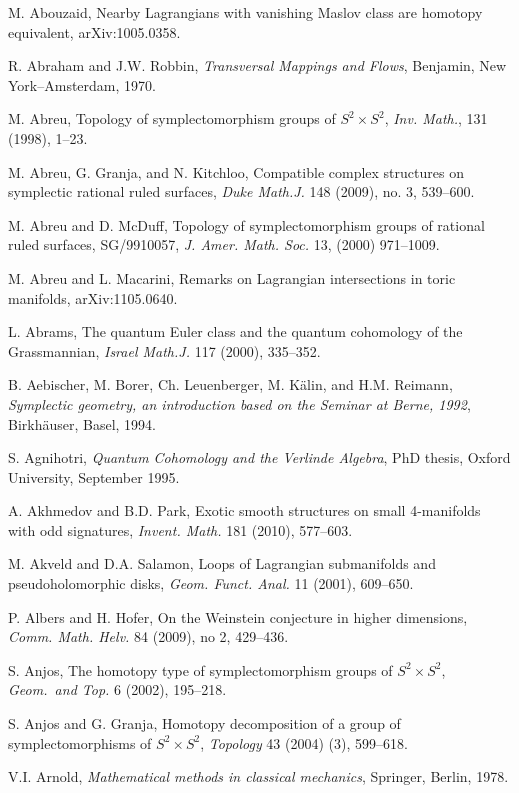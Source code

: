 
 M. Abouzaid, Nearby Lagrangians with vanishing Maslov class are homotopy equivalent, arXiv:1005.0358.

 R. Abraham and J.W. Robbin, \emph{Transversal Mappings and Flows}, Benjamin, New York–Amsterdam, 1970.

 M. Abreu, Topology of symplectomorphism groups of $S^{2}\times S^{2}$, \emph{Inv. Math.}, 131 (1998), 1–23.

 M. Abreu, G. Granja, and N. Kitchloo, Compatible complex structures on symplectic rational ruled surfaces, \emph{Duke Math.J.} 148 (2009), no. 3, 539–600.

 M. Abreu and D. McDuff, Topology of symplectomorphism groups of rational ruled surfaces, SG/9910057, \emph{J. Amer. Math. Soc.} 13, (2000) 971–1009.

 M. Abreu and L. Macarini, Remarks on Lagrangian intersections in toric manifolds, arXiv:1105.0640.

 L. Abrams, The quantum Euler class and the quantum cohomology of the Grassmannian, \emph{Israel Math.J.} 117 (2000), 335–352.

 B. Aebischer, M. Borer, Ch. Leuenberger, M. Kälin, and H.M. Reimann, \emph{Symplectic geometry, an introduction based on the Seminar at Berne, 1992}, Birkhäuser, Basel, 1994.

 S. Agnihotri, \emph{Quantum Cohomology and the Verlinde Algebra}, PhD thesis, Oxford University, September 1995.

 A. Akhmedov and B.D. Park, Exotic smooth structures on small 4-manifolds with odd signatures, \emph{Invent. Math.} 181 (2010), 577–603.

 M. Akveld and D.A. Salamon, Loops of Lagrangian submanifolds and pseudoholomorphic disks, \emph{Geom. Funct. Anal.} 11 (2001), 609–650.

 P. Albers and H. Hofer, On the Weinstein conjecture in higher dimensions, \emph{Comm. Math. Helv.} 84 (2009), no 2, 429–436.

 S. Anjos, The homotopy type of symplectomorphism groups of $S^{2}\times S^{2}$, \emph{Geom.\ and Top.} 6 (2002), 195–218.

 S. Anjos and G. Granja, Homotopy decomposition of a group of symplectomorphisms of $S^{2}\times S^{2}$, \emph{Topology} 43 (2004) (3), 599–618.

 V.I. Arnold, \emph{Mathematical methods in classical mechanics}, Springer, Berlin, 1978.


